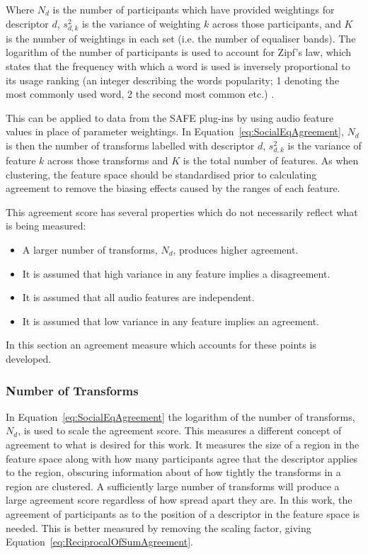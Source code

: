 		Where $N_{d}$ is the number of participants which have provided weightings for descriptor $d$,
		$s_{d,k}^{2}$ is the variance of weighting $k$ across those participants, and $K$ is the number of
		weightings in each set (i.e. the number of equaliser bands). The logarithm of the number of
		participants is used to account for Zipf's law, which states that the frequency with which a word is used
		is inversely proportional to its usage ranking (an integer describing the words popularity; 1 denoting the
		most commonly used word, 2 the second most common etc.) \citep{manning1999foundations}.

		This can be applied to data from the SAFE plug-ins by using audio feature values in place of parameter
		weightings. In Equation~\ref{eq:SocialEqAgreement}, $N_{d}$ is then the number of transforms labelled with
		descriptor $d$, $s_{d,k}^{2}$ is the variance of feature $k$ across those transforms and $K$ is the total
		number of features. As when clustering, the feature space should be standardised prior to calculating
		agreement to remove the biasing effects caused by the ranges of each feature.

		This agreement score has several properties which do not necessarily reflect what is being measured:

		\begin{itemize}
			\item A larger number of transforms, $N_{d}$, produces higher agreement.
			\item It is assumed that high variance in any feature implies a disagreement. 
			\item It is assumed that all audio features are independent. 
			\item It is assumed that low variance in any feature implies an agreement. 
		\end{itemize}

		In this section an agreement measure which accounts for these points is developed.

		\subsubsection*{Number of Transforms}
			In Equation~\ref{eq:SocialEqAgreement} the logarithm of the number of transforms, $N_{d}$, is used
			to scale the agreement score. This measures a different concept of agreement to what is desired for
			this work. It measures the size of a region in the feature space along with how many participants
			agree that the descriptor applies to the region, obscuring information about of how tightly the
			transforms in a region are clustered. A sufficiently large number of transforms will produce a
			large agreement score regardless of how spread apart they are. In this work, the agreement of
			participants as to the position of a descriptor in the feature space is needed. This is better
			measured by removing the scaling factor, giving Equation~\ref{eq:ReciprocalOfSumAgreement}.

